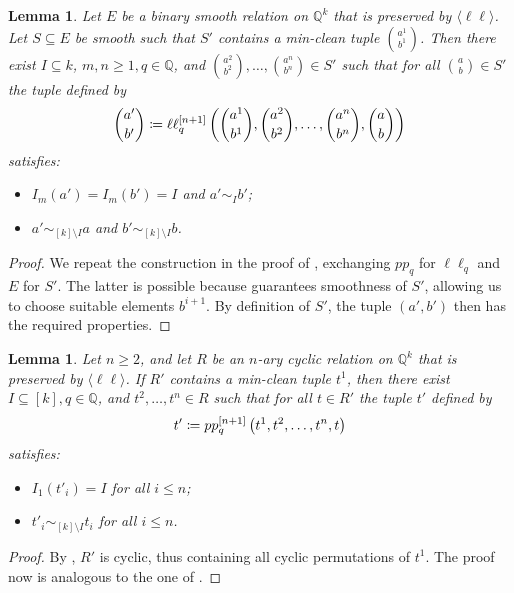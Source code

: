 \documentclass[a4paper,reqno, cleveref]{amsart}
\newcommand{\coloneqq}{\mathrel{\mathop:}\mathrel{\mkern-1.2mu}=}
\newtheorem{lemma}[theorem]{Lemma}
\newcommand{\Q}{\mathbb{Q}}
\newcommand{\br}[1]{[#1]}
\newcommand{\bin}{E}
\newcommand{\pp}[1]{pp_{#1}}
\newcommand{\nested}[2]{{#1^{[#2]}}}
\newcommand{\gen}[1]{\langle#1\rangle}
\begin{document}
\begin{lemma}\label{cl:ll:slice}
    Let $\bin$ be a binary smooth relation on $\Q^k$ that is preserved by $\gen{\ell\ell}$. Let $S \subseteq \bin$ be smooth such that $S'$ contains a min-clean tuple $\binom{a^1}{b^1}$. Then there exist $I\subseteq k$, $m,n\geq1,  q\in \Q$, and $\binom{a^2}{b^2},\ldots,\binom{a^n}{b^n}\in S'$ such that for all $\binom{a}{b} \in S'$ the tuple  defined by 
  \begin{equation*}
       \binom{a'}{b'}\coloneqq \nested{\ell\ell_q}{n+1} \left(\binom{a^1}{b^1},\binom{a^2}{b^2}, \dots,\binom{a^n}{b^n},\binom{a}{b}\right)
  \end{equation*} 
  satisfies:
  \begin{itemize}
      \item $I_m(a')=I_m(b')=I$ and $a'\sim_I b'$;
      \item $a'\sim_{\br k\setminus I} a$ and $b'\sim_{\br k\setminus I} b$.
  \end{itemize}  
\end{lemma}
\begin{proof}
    We repeat the construction in the proof of , exchanging $\pp{q}$ for $\ell\ell_q$ and $E$ for $S'$.
    The latter is possible because  guarantees smoothness of $S'$, allowing us to choose suitable elements $b^{i+1}$.
    By definition of $S'$, the tuple $(a', b')$ then has the required properties. 
\end{proof}

\begin{lemma}\label{l:ll:hypslice}
   Let $n \geq 2$, and let $R$ be an $n$-ary cyclic relation on $\Q^k$ that is preserved by $\gen{\ell\ell}$. If $R'$ contains a min-clean tuple $t^1$,
%
then there exist $I\subseteq \br k,  q\in \Q$, and $t^2, \dots, t^n\in R$ such that for all $t \in R'$ the tuple $t'$  defined by 
  \begin{equation*}
       t'\coloneqq \nested{pp_q}{n+1} \left(t^1, t^2, \dots, t^n, t\right)
  \end{equation*} 
  satisfies:
  \begin{itemize}
      \item $I_{1}(t'_i)=I$ for all $i \leq n$;
      \item $t'_i\sim_{\br k\setminus I} t_i$ for all $i \leq  n$.
  \end{itemize} 
\end{lemma}
\begin{proof}
    By , $R'$ is cyclic, thus containing all cyclic permutations of $t^1$. 
    The proof now is analogous to the one of . 
\end{proof}
\end{document}
